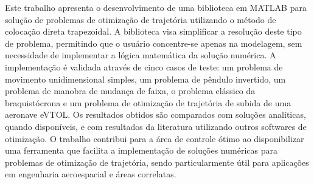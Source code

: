 Este trabalho apresenta o desenvolvimento de uma biblioteca em MATLAB para solução de problemas de otimização de trajetória utilizando o método de colocação direta trapezoidal. A biblioteca visa simplificar a resolução deste tipo de problema, permitindo que o usuário concentre-se apenas na modelagem, sem necessidade de implementar a lógica matemática da solução numérica. A implementação é validada através de cinco casos de teste: um problema de movimento unidimensional simples, um problema de pêndulo invertido, um problema de manobra de mudança de faixa, o problema clássico da braquistócrona e um problema de otimização de trajetória de subida de uma aeronave eVTOL. Os resultados obtidos são comparados com soluções analíticas, quando disponíveis, e com resultados da literatura utilizando outros softwares de otimização. O trabalho contribui para a área de controle ótimo ao disponibilizar uma ferramenta que facilita a implementação de soluções numéricas para problemas de otimização de trajetória, sendo particularmente útil para aplicações em engenharia aeroespacial e áreas correlatas.